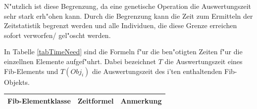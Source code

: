N"utzlich ist diese Begrenzung, da eine genetische Operation die Auswertungszeit sehr stark erh"ohen kann. Durch die Begrenzung kann die Zeit zum Ermitteln der Zeitstatistik begrenzt werden und alle Individuen, die diese Grenze erreichen sofort verworfen/ gel"oscht werden.

In Tabelle \ref{tabTimeNeed} sind die Formeln f"ur die ben"otigten Zeiten f"ur die einzellnen Elemente aufgef"uhrt. Dabei bezeichnet $T$ die Auswertungszeit eines Fib-Elements und $T(Obj_i)$ die Auswertungszeit des i'ten enthaltenden Fib-Objekts.

\begin{center}
\begin{longtable}{|p{22mm}|p{50mm}|p{50mm}|}\hline
	Fib-Ele\-ment\-klasse & Zeitformel & Anmerkung \\\hline\endhead


\end{longtable}
\end{center}
